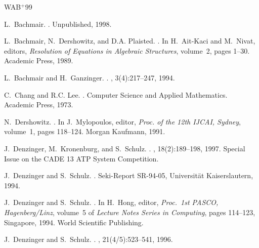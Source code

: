\documentclass{article}
\begin{document}
%
\newcommand{\etalchar}[1]{$^{#1}$}
\begin{thebibliography}{WAB{\etalchar{+}}99}

L.~Bachmair.
.
\newblock Unpublished, 1998.

L.~Bachmair, N.~Dershowitz, and D.A. Plaisted.
.
\newblock In H.~Ait-Kaci and M.~Nivat, editors, {\em Resolution of Equations in
  Algebraic Structures}, volume~2, pages 1--30. Academic Press, 1989.

L.~Bachmair and H.~Ganzinger.
.
, 3(4):217--247, 1994.

C.~Chang and R.C. Lee.
.
\newblock Computer Science and Applied Mathematics. Academic Press, 1973.

N.~Dershowitz.
.
\newblock In J.~Mylopoulos, editor, {\em Proc. of the 12th IJCAI, Sydney},
  volume~1, pages 118--124. Morgan Kaufmann, 1991.

J.~Denzinger, M.~Kronenburg, and S.~Schulz.
.
, 18(2):189--198, 1997.
\newblock Special Issue on the CADE 13 ATP System Competition.

J.~Denzinger and S.~Schulz.
.
\newblock Seki-Report SR-94-05, Universit{\"a}t Kai\-sers\-lau\-tern, 1994.

J.~Denzinger and S.~Schulz.
.
\newblock In H.~Hong, editor, {\em Proc.\ 1st PASCO, Hagenberg/Linz}, volume~5
  of {\em Lecture Notes Series in Computing}, pages 114--123, Singapore, 1994.
  World Scientific Publishing.

J.~Denzinger and S.~Schulz.
.
, 21(4/5):523--541, 1996.


\end{thebibliography}
\end{document}
